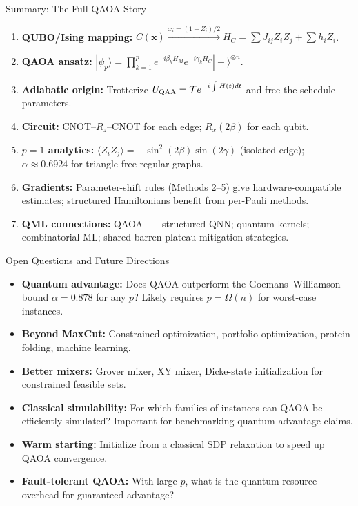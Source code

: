 \documentclass{beamer}
\begin{document}
\begin{frame}{Summary: The Full QAOA Story}
\begin{enumerate}
\item \textbf{QUBO/Ising mapping:}
  $C(\mathbf{x}) \xrightarrow{x_i=(1-Z_i)/2} H_C = \sum J_{ij}Z_iZ_j + \sum h_iZ_i$.

\item \textbf{QAOA ansatz:}
  $|\psi_p\rangle = \prod_{k=1}^p e^{-i\beta_k H_M}e^{-i\gamma_k H_C}|+\rangle^{\otimes n}$.

\item \textbf{Adiabatic origin:}
  Trotterize $U_{\rm QAA} = \mathcal{T}e^{-i\int H(t)dt}$ and free
  the schedule parameters.

\item \textbf{Circuit:}
  CNOT--$R_z$--CNOT for each edge; $R_x(2\beta)$ for each qubit.

\item \textbf{$p=1$ analytics:}
  $\langle Z_iZ_j\rangle = -\sin^2(2\beta)\sin(2\gamma)$ (isolated edge);
  $\alpha \approx 0.6924$ for triangle-free regular graphs.

\item \textbf{Gradients:}
  Parameter-shift rules (Methods 2--5) give hardware-compatible
  estimates; structured Hamiltonians benefit from per-Pauli methods.

\item \textbf{QML connections:}
  QAOA $\equiv$ structured QNN; quantum kernels; combinatorial ML;
  shared barren-plateau mitigation strategies.
\end{enumerate}
\end{frame}


\begin{frame}{Open Questions and Future Directions}
\begin{itemize}
\item \textbf{Quantum advantage:} Does QAOA outperform the
  Goemans--Williamson bound $\alpha=0.878$ for any $p$? Likely
  requires $p = \Omega(n)$ for worst-case instances.
\item \textbf{Beyond MaxCut:} Constrained optimization, portfolio
  optimization, protein folding, machine learning.
\item \textbf{Better mixers:} Grover mixer, XY mixer, Dicke-state
  initialization for constrained feasible sets.
\item \textbf{Classical simulability:} For which families of
  instances can QAOA be efficiently simulated? Important for
  benchmarking quantum advantage claims.
\item \textbf{Warm starting:} Initialize from a classical SDP
  relaxation to speed up QAOA convergence.
\item \textbf{Fault-tolerant QAOA:} With large $p$, what is the
  quantum resource overhead for guaranteed advantage?
\end{itemize}
\end{frame}

\end{document}
